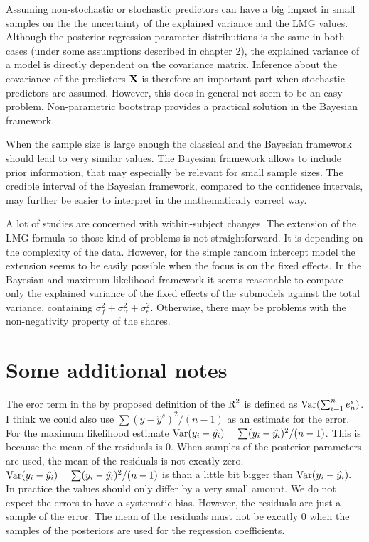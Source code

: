 \documentclass[11pt,a4paper,twoside]{book}\usepackage[]{graphicx}\usepackage[]{color}
\begin{document}
Assuming non-stochastic or stochastic predictors can have a big impact in small samples on the the uncertainty of the explained variance and the LMG values. Although the posterior regression parameter distributions is the same in both cases (under some assumptions described in chapter 2), the explained variance of a model is directly dependent on the covariance matrix. Inference about the covariance of the predictors ${\mathbf{X}}$ is therefore an important part when stochastic predictors are assumed. However, this does in general not seem to be an easy problem. Non-parametric bootstrap provides a practical solution in the Bayesian framework. 

 When the sample size is large enough the classical and the Bayesian framework should lead to very similar values. The Bayesian framework allows to include prior information, that may especially be relevant for small sample sizes. The credible interval of the Bayesian framework, compared to the confidence intervals, may further be easier to interpret in the mathematically correct way.
 
A lot of studies are concerned with within-subject changes. The extension of the LMG formula to those kind of problems is not straightforward. It is depending on the complexity of the data. However, for the simple random intercept model the extension seems to be easily possible when the focus is on the fixed effects. In the Bayesian and maximum likelihood framework it seems reasonable to compare only the explained variance of the fixed effects of the submodels against the total variance, containing $\sigma_{f}^2 + \sigma_{\alpha}^2 + \sigma_{\epsilon}^2$. Otherwise, there may be problems with the non-negativity property of the shares. 









\cleardoublepage

\appendix


\chapter{Some additional notes}

The eror term in the by \cite{Gelman2017} proposed definition of the $\text{R}^2$ is defined as $\operatorname{Var}(\sum_{i=1}^{n}e^s_{n})$. I think we could also use $ \sum(y - \hat{y}^s)^2/(n-1) $ as an estimate for the error. For the maximum likelihood estimate $\operatorname{Var}(y_{i} - \hat{y_{i}}) = \sum (y_{i} - \hat{y_{i}})^2/ (n-1) $. This is because the mean of the residuals is 0. When  samples of the posterior parameters are used, the mean of the residuals is not excatly zero. $\operatorname{Var}(y_{i} - \hat{y_{i}}) = \sum (y_{i} - \hat{y_{i}})^2/ (n-1) $ is than a little bit bigger than $\operatorname{Var}(y_{i} - \hat{y_{i}}). $ In practice the values should only differ by a very small amount. We do not expect the errors to have a systematic bias. However, the residuals are just a sample of the error. The mean of the residuals must not be excatly 0 when the samples of the posteriors are used for the regression coefficients.   
\end{document}
